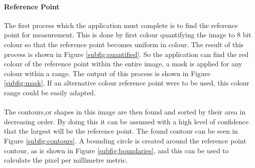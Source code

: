 			\paragraph{Reference Point}
				The first process which the application must complete is to find the reference point for measurement. This is done by first colour quantifying the image to 8 bit colour so that the reference point becomes uniform in colour. The result of this process is shown in Figure \ref{subfig:quantified}. So the application can find the red colour of the reference point within the entire image, a mask is applied for any colour within a range. The output of this process is shown in Figure \ref{subfig:mask}. If an alternative colour reference point were to be used, this colour range could be easily adapted.
				\\\\
				The contours,or shapes in this image are then found and sorted by their area in decreasing order. By doing this it can be assumed with a high level of confidence that the largest will be the reference point. The found contour can be seen in Figure \ref{subfig:contours}. A bounding circle is created around the reference point contour, as is shown in Figure \ref{subfig:boundaries}, and this can be used to calculate the pixel per millimetre metric.
